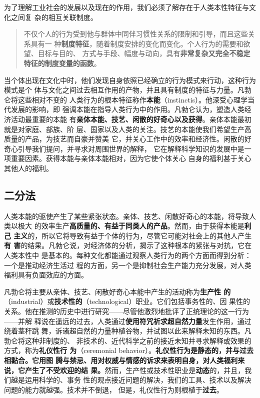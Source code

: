 为了理解工业社会的发展以及现在的作用，我们必须了解存在于人类本性特征与文化之间复
杂的相互关联制度。
\begin{quotation}
  不仅个人的行为受到他与群体中同伴习惯性关系的限制和引导，而且这些关系具有一
  种\textbf{制度特征}，随着制度安排的变化而变化。个人行为的需要和欲望、目标与目的、
  方式与手段、幅度与动向，具有\textbf{非常复杂又完全不稳定特征的制度变量的函数}。
\end{quotation}

当个体出现在文化中时，他们发现自身依照已经确立的行为模式来行动，这种行为模式是个
体与文化之间过去相互作用的产物，并且具有制度的特征与力量。凡勃仑将这些相对不变的
人类行为的根本特征称作\textbf{本能}（instinctis）。他深受心理学当代发展的影响，即
强调本能在指导人类行为中的作用。凡勃仑认为，塑造人类经济活动最重要的本能
有\textbf{亲体本能、技艺、闲散的好奇心以及获得}。亲体本能最初就是对家庭、部族、阶
层、国家以及人类的关注。技艺的本能使我们希望生产高质量的产品，为技艺而自豪并赞美
它，并关心工作中的效率和经济性。闲散的好奇心引导我们提问，并寻求对周围世界的解释，
它在解释科学知识的发展中是一项重要因素。获得本能与亲体本能相对，因为它使个体关心
自身的福利甚于关心其他人的福利。

\subsection{二分法}

人类本能的驱使产生了某些紧张状态。亲体、技艺、闲散好奇心的本能，将导致人类以极大
的效率生产\textbf{高质量的、有益于同类人的产品}。然而，由于获得本能是\textbf{利己
  主义}的，所以它将导致有益于个体的行为，尽管它可能对社会上的其他人产生\textbf{有
  害}的结果。凡勃仑说，对经济体的分析，揭示了这种根本的紧张与对抗，它在人类本性中
是基本的。每种文化都能通过观察人类行为的两个方面而得到分析：一个是推动经济生活过
程的方面，另一个是抑制社会生产能力充分发展，对人类福利具有负面效应的方面。

凡勃仑将主要从亲体、技艺、闲散好奇心本能中产生的活动称为\textbf{生产性
  的}（industrial）或\textbf{技术性的}（technological）职业。它们包括事务性的、因
果性的关系。他在推测的历史中进行研究——尽管他激烈地批评了正统理论的这一行为——并解
释说在遥远的过去，人类通过\textbf{使用符咒祈求超自然力量}发生作用，通过绕着茎秆跳
舞，诉诸超自然的力量种植谷物，并试图以此来解释未知的东西。凡勃仑将这种非制度的、
非技术的、近代科学之前的接近未知并寻求解释或效果的方式，称为\textbf{礼仪性行
  为}（ceremonial behavior）。\textbf{礼仪性行为是静态的，并与过去相黏合。它用图
  腾与禁忌、用对权威与情感的诉求来表明自身，对人类福利来说，它产生了不受欢迎的结
  果。}然而，生产性或技术性职业是\textbf{动态}的，并且，我们越是运用科学的、事务
性的观点接近问题的解决，我们的工具、技术以及解决问题的能力就越强。技术并不倒退，
但是，礼仪性行为则根植于\textbf{过去}。

